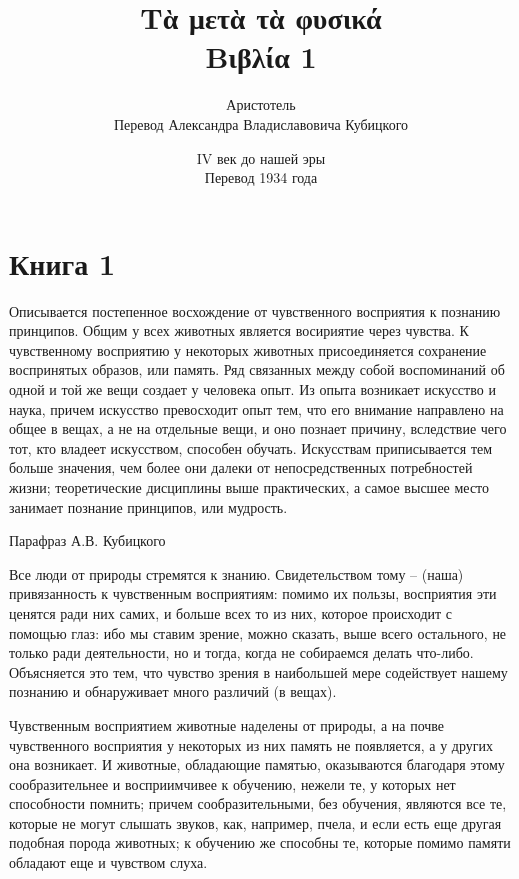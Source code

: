 \documentclass[oneside, 17pt, dvipsnames]{extbook}
\title{
    Τὰ μετὰ τὰ φυσικά
    \\
    Βιβλία 1
}
\author{
    Аристотель
    \\
    Перевод Александра Владиславовича Кубицкого
}
\date{
    IV век до нашей эры
    \\
    Перевод 1934 года
}
\begin{document}
\maketitle
\tableofcontents

\section{Книга 1}

\epigraph{
Описывается постепенное восхождение от чувственного восприятия к познанию принципов. Общим у всех животных является восириятие через чувства. К чувственному восприятию у некоторых животных присоединяется сохранение воспринятых образов, или память. Ряд связанных между собой воспоминаний об одной и той же вещи создает у человека опыт. Из опыта возникает искусство и наука, причем искусство превосходит опыт тем, что его внимание направлено на общее в вещах, а не на отдельные вещи, и оно познает причину, вследствие чего тот, кто владеет искусством, способен обучать. Искусствам приписывается тем больше значения, чем более они далеки от непосредственных потребностей жизни; теоретические дисциплины выше практических, а самое высшее место занимает познание принципов, или мудрость.
}{Парафраз А.В. Кубицкого}

Все люди от природы стремятся к знанию. Свидетельством тому -- (наша) привязанность к чувственным восприятиям: помимо их пользы, восприятия эти ценятся ради них самих, и больше всех то из них, которое происходит с помощью глаз: ибо мы ставим зрение, можно сказать, выше всего остального, не только ради деятельности, но и тогда, когда не собираемся делать что-либо. Объясняется это тем, что чувство зрения в наибольшей мере содействует нашему познанию и обнаруживает много различий (в вещах).

Чувственным восприятием животные наделены от природы, а на почве чувственного восприятия у некоторых из них память не появляется, а у других она возникает. И животные, обладающие памятью, оказываются благодаря этому сообразительнее и восприимчивее к обучению, нежели те, у которых нет способности помнить; причем сообразительными, без обучения, являются все те, которые не могут слышать звуков, как, например, пчела, и если есть еще другая подобная порода животных; к обучению же способны те, которые помимо памяти обладают еще и чувством слуха.
\end{document}
